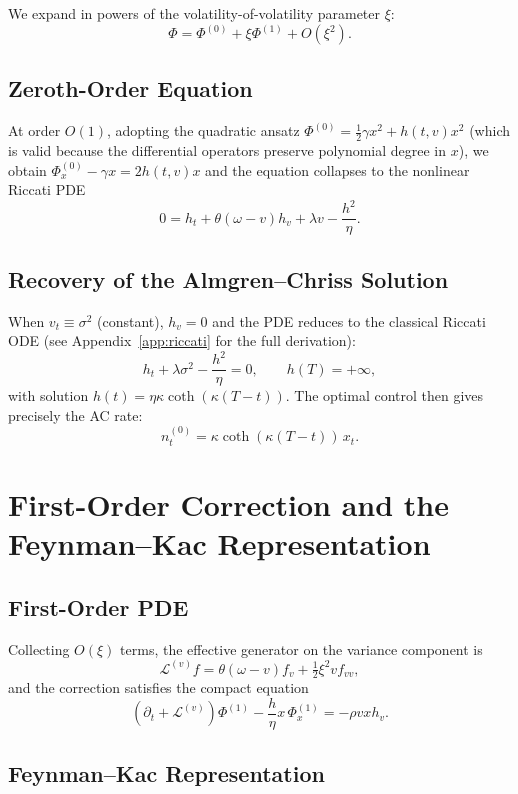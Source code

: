 \documentclass[11pt]{article}
\begin{document}
We expand in powers of the volatility-of-volatility parameter $\xi$:
\[
\Phi = \Phi^{(0)} + \xi\Phi^{(1)} + O(\xi^2).
\]

\subsection{Zeroth-Order Equation}

At order $O(1)$, adopting the quadratic ansatz
$\Phi^{(0)} = \frac{1}{2}\gamma x^2 + h(t,v)x^2$ (which is valid because the differential
operators preserve polynomial degree in $x$), we obtain $\Phi_x^{(0)} - \gamma x = 2h(t,v)x$ and
the equation collapses to the nonlinear Riccati PDE
\[
0 = h_t + \theta(\omega-v)h_v + \lambda v - \frac{h^2}{\eta}.
\]

\subsection{Recovery of the Almgren--Chriss Solution}

When $v_t \equiv \sigma^2$ (constant), $h_v = 0$ and the PDE reduces to the classical Riccati
ODE (see Appendix~\ref{app:riccati} for the full derivation):
\[
h_t + \lambda\sigma^2 - \frac{h^2}{\eta} = 0, \qquad h(T) = +\infty,
\]
with solution $h(t) = \eta\kappa\coth(\kappa(T-t))$.
The optimal control then gives precisely the AC rate:
\[
\boxed{n_t^{(0)} = \kappa\coth(\kappa(T-t))\,x_t.}
\]

\section{First-Order Correction and the Feynman--Kac Representation}

\subsection{First-Order PDE}

Collecting $O(\xi)$ terms, the effective generator on the variance component is
\[
\mathcal{L}^{(v)}f = \theta(\omega-v)f_v + \tfrac12\xi^2vf_{vv},
\]
and the correction satisfies the compact equation
\[
\left(\partial_t + \mathcal{L}^{(v)}\right)\Phi^{(1)} - \frac{h}{\eta}x\,\Phi_x^{(1)}
= -\rho vxh_v.
\]

\subsection{Feynman--Kac Representation}
\end{document}
